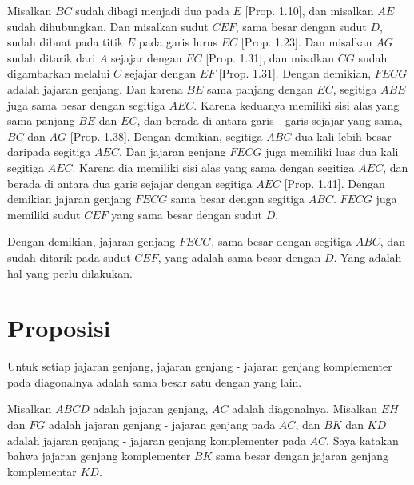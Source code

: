 \documentclass[a4paper]{book}
\begin{document}
Misalkan $BC$ sudah dibagi menjadi dua pada $E$ [Prop. 1.10], dan misalkan
$AE$ sudah dihubungkan. Dan misalkan sudut $CEF$, sama besar dengan sudut
$D$, sudah dibuat pada titik $E$ pada garis lurus $EC$ [Prop. 1.23]. Dan
misalkan $AG$ sudah ditarik dari $A$ sejajar dengan $EC$ [Prop. 1.31], dan
misalkan $CG$ sudah digambarkan melalui $C$ sejajar dengan $EF$ [Prop. 1.31].
Dengan demikian, $FECG$ adalah jajaran genjang. Dan karena $BE$ sama panjang 
dengan $EC$, segitiga $ABE$ juga sama besar dengan segitiga $AEC$. Karena 
keduanya memiliki sisi alas yang sama panjang $BE$ dan $EC$, dan berada di 
antara garis - garis sejajar yang sama, $BC$ dan $AG$ [Prop. 1.38]. Dengan
demikian, segitiga $ABC$ dua kali lebih besar daripada segitiga $AEC$. Dan
jajaran genjang $FECG$ juga memiliki luas dua kali segitiga $AEC$. Karena dia
memiliki sisi alas yang sama dengan  segitiga $AEC$, dan berada di antara dua 
garis sejajar  dengan segitiga $AEC$ [Prop. 1.41]. Dengan demikian jajaran
genjang $FECG$ sama besar dengan segitiga $ABC$. $FECG$ juga memiliki sudut
$CEF$ yang sama besar dengan sudut $D$.

Dengan demikian, jajaran genjang $FECG$, sama besar dengan segitiga $ABC$, 
dan sudah ditarik pada sudut $CEF$, yang adalah sama besar dengan $D$. Yang 
adalah  hal yang perlu dilakukan.

\section*{\centering Proposisi \thesection} 
Untuk setiap jajaran genjang, jajaran genjang - jajaran genjang komplementer
pada diagonalnya adalah sama besar satu dengan yang lain.

\begin{center}
\end{center}

Misalkan $ABCD$ adalah jajaran genjang, $AC$ adalah diagonalnya. Misalkan $EH$
dan $FG$ adalah jajaran genjang - jajaran genjang pada $AC$, dan $BK$ dan $KD$
adalah jajaran genjang - jajaran genjang komplementer pada $AC$. Saya katakan 
bahwa jajaran genjang komplementer $BK$ sama besar dengan  jajaran genjang 
komplementar $KD$.
\end{document}
